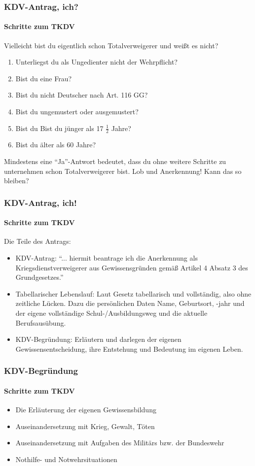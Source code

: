\documentclass{beamer}
\begin{document}
	\begin{frame}
		\frametitle{KDV-Antrag, ich?}
		\framesubtitle{Schritte zum TKDV}
		Vielleicht bist du eigentlich schon Totalverweigerer und weißt es nicht? 
		\begin{enumerate}
			\item Unterliegst du als Ungedienter nicht der Wehrpflicht?
			\item Bist du eine Frau? 
			\item Bist du nicht Deutscher nach Art. 116 GG?
			\item Bist du ungemustert oder ausgemustert?
			\item Bist du Bist du jünger als 17 $ \frac{1}{2} $ Jahre?
			\item Bist du älter als 60 Jahre?
		\end{enumerate}
		Mindestens eine \enquote{Ja}-Antwort bedeutet, dass du ohne weitere Schritte zu unternehmen schon Totalverweigerer bist. Lob und Anerkennung! Kann das so bleiben? %
	\end{frame}
	
	\begin{frame}
		\frametitle{KDV-Antrag, ich!}
		\framesubtitle{Schritte zum TKDV}
		Die Teile des Antrags:
		\begin{itemize}
			\item KDV-Antrag: \enquote{... hiermit beantrage ich die Anerkennung als Kriegsdienstverweigerer aus Gewissensgründen gemäß Artikel 4 Absatz 3 des Grundgesetzes.}
			\item Tabellarischer Lebenslauf: Laut Gesetz tabellarisch und vollständig, also ohne zeitliche Lücken. Dazu die persönlichen Daten Name, Geburtsort, -jahr und der eigene vollständige Schul-/Ausbildungsweg und die aktuelle Berufsausübung.
			\item KDV-Begründung: Erläutern und darlegen der eigenen Gewissensentscheidung, ihre Entstehung und Bedeutung im eigenen Leben.
		\end{itemize}			
	\end{frame}
	
	\begin{frame}
		\frametitle{KDV-Begründung}
		\framesubtitle{Schritte zum TKDV}
		\begin{itemize}
			\item Die Erläuterung der eigenen Gewissensbildung
			\item Auseinandersetzung mit Krieg, Gewalt, Töten
			\item Auseinandersetzung mit Aufgaben des Militärs bzw. der Bundeswehr
			\item Nothilfe- und Notwehrsituationen
		\end{itemize}
	\end{frame}
	
\end{document}
